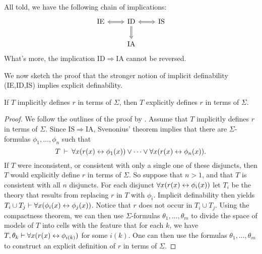 All told, we have the following chain of implications:
\[ \begin{tikzcd}
  \mathrm{IE} \arrow[Leftrightarrow]{r}{} & \mathrm{ID}
  \arrow[Leftrightarrow]{r}{} \arrow[Rightarrow]{d}{} & \mathrm{IS} \\
  & \mathrm{IA}
\end{tikzcd} \] What's more, the implication
$\mathrm{ID}\Rightarrow\mathrm{IA}$ cannot be reversed.

We now sketch the proof that the stronger notion of implicit
definability (IE,ID,IS) implies explicit definability.

\begin{thm} If $T$ implicitly defines $r$ in terms of
  $\Sigma$, then $T$ explicitly defines $r$ in terms of
  $\Sigma$. \end{thm}

\begin{proof} We follow the outlines of the proof by
  \citet[185]{poizat}.  Assume that $T$ implicitly defines $r$ in
  terms of $\Sigma$.  Since $\mathrm{IS}\Rightarrow\mathrm{IA}$,
  Svenonius' theorem implies that there are $\Sigma$-formulas
  $\phi _1,\dots ,\phi _n$ such that
  \[ T\:\vdash\: \forall x(r(x)\leftrightarrow \phi _1(x))\vee\cdots\vee \forall
    x(r(x)\leftrightarrow \phi _n(x)) .\] If $T$ were inconsistent, or consistent
  with only a single one of these disjuncts, then $T$ would explicitly
  define $r$ in terms of $\Sigma$.  So suppose that $n>1$, and that
  $T$ is consistent with all $n$ disjuncts.  For each disjunct
  $\forall x(r(x)\leftrightarrow \phi _i(x))$ let $T_i$ be the theory that
  results from replacing $r$ in $T$ with $\phi _i$.  Implicit
  definability then yields
  $T_i\cup T_j\vdash \forall x(\phi _i(x)\leftrightarrow \phi _j(x))$.  Notice
  that $r$ does not occur in $T_i\cup T_j$.  Using the compactness
  theorem, we can then use $\Sigma$-formulas
  $\theta _1,\dots ,\theta _m$ to divide the space of models of $T$
  into cells with the feature that for each $k$, we have
  $T,\theta _k\vdash \forall x(r(x)\leftrightarrow \phi _{i(k)})$ for some
  $i(k)$.  One can then use the formulas $\theta _1,\dots ,\theta _m$
  to construct an explicit definition of $r$ in terms of $\Sigma$.
\end{proof}










